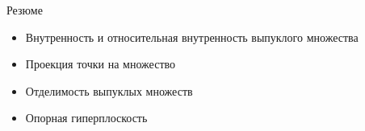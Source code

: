 \documentclass[12pt]{beamer}
\begin{document}
\begin{frame}{Резюме}
\begin{itemize}
\item Внутренность и относительная внутренность выпуклого множества
\item Проекция точки на множество
\item Отделимость выпуклых множеств
\item Опорная гиперплоскость
\end{itemize}
\end{frame}
\end{document}
